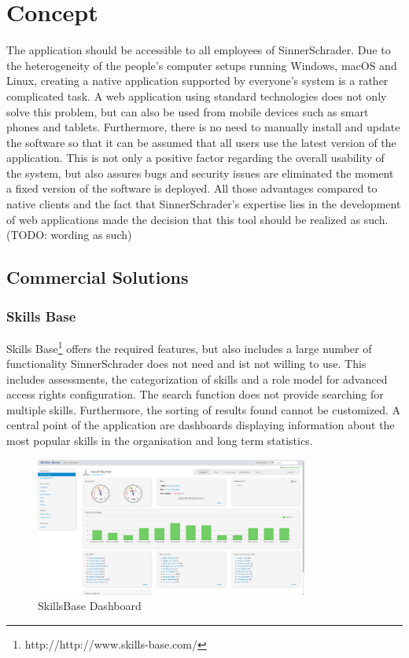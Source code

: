 \chapter{Concept}
The application should be accessible to all employees of SinnerSchrader. Due to the heterogeneity of the people’s computer setups running Windows, macOS and Linux, creating a native application supported by everyone’s system is a rather complicated task. A web application using standard technologies does not only solve this problem, but can also be used from mobile devices such as smart phones and tablets. Furthermore, there is no need to manually install and update the software so that it can be assumed that all users use the latest version of the application. This is not only a positive factor regarding the overall usability of the system, but also assures bugs and security issues are eliminated the moment a fixed version of the software is deployed. All those advantages compared to native clients and the fact that SinnerSchrader’s expertise lies in the development of web applications made the decision that this tool should be realized as such. (TODO: wording as such)



\section{Commercial Solutions}

\subsection{Skills Base}
Skills Base\footnote{http://http://www.skills-base.com/} offers the required features, but also includes a large number of functionality SinnerSchrader does not need and ist not willing to use. This includes assessments, the categorization of skills and a role model for advanced access rights configuration.
The search function does not provide searching for multiple skills. Furthermore, the sorting of results found cannot be customized. A central point of the application are dashboards displaying information about the most popular skills in the organisation and long term statistics.
\begin{figure}[h]
    \centering
    \includegraphics[width=0.8\textwidth]{images/skillsbase-dashboard.png}
    \caption{SkillsBase Dashboard}
    \label{fig:skillsbase_dashboard}
\end{figure}

